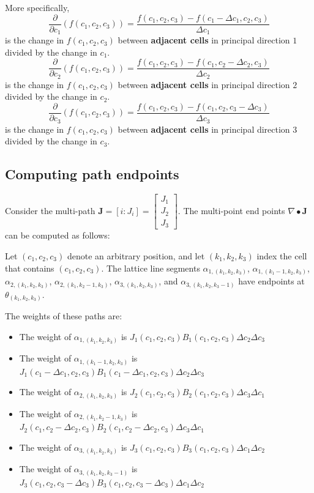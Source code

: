 More specifically, 
\[\frac{\partial}{\partial c_1}(f(c_1, c_2, c_3)) = \frac{f(c_1, c_2, c_3) - f(c_1 - \Delta c_1, c_2, c_3)}{\Delta c_1}\]
is the change in \(f(c_1, c_2, c_3)\) between {\bf adjacent cells} in principal direction \(1\) divided by the change in \(c_1\).
\[\frac{\partial}{\partial c_2}(f(c_1, c_2, c_3)) = \frac{f(c_1, c_2, c_3) - f(c_1, c_2 - \Delta c_2, c_3)}{\Delta c_2}\]
is the change in \(f(c_1, c_2, c_3)\) between {\bf adjacent cells} in principal direction \(2\) divided by the change in \(c_2\).
\[\frac{\partial}{\partial c_3}(f(c_1, c_2, c_3)) = \frac{f(c_1, c_2, c_3) - f(c_1, c_2, c_3 - \Delta c_3)}{\Delta c_3}\]
is the change in \(f(c_1, c_2, c_3)\) between {\bf adjacent cells} in principal direction \(3\) divided by the change in \(c_3\).




\subsection{Computing path endpoints}

Consider the multi-path \(\mathbf{J} = [i : J_i] = \begin{bmatrix} J_1 \\ J_2 \\ J_3 \end{bmatrix}\). The multi-point end points \(\nabla \bullet \mathbf{J}\) can be computed as follows:

Let \((c_1, c_2, c_3)\) denote an arbitrary position, and let \((k_1, k_2, k_3)\) index the cell that contains \((c_1, c_2, c_3)\). The lattice line segments \(\alpha_{1,(k_1,k_2,k_3)}\), \(\alpha_{1,(k_1-1,k_2,k_3)}\), \(\alpha_{2,(k_1,k_2,k_3)}\), \(\alpha_{2,(k_1,k_2-1,k_3)}\), \(\alpha_{3,(k_1,k_2,k_3)}\), and \(\alpha_{3,(k_1,k_2,k_3-1)}\) have endpoints at \(\theta_{(k_1, k_2, k_3)}\). 

The weights of these paths are:
\begin{itemize}
\item The weight of \(\alpha_{1,(k_1,k_2,k_3)}\) is \(J_1(c_1,c_2,c_3) B_1(c_1, c_2, c_3) \Delta c_2 \Delta c_3\)
\item The weight of \(\alpha_{1,(k_1-1,k_2,k_3)}\) is \(J_1(c_1 - \Delta c_1,c_2,c_3) B_1(c_1 - \Delta c_1, c_2, c_3) \Delta c_2 \Delta c_3\)
\item The weight of \(\alpha_{2,(k_1,k_2,k_3)}\) is \(J_2(c_1,c_2,c_3) B_2(c_1, c_2, c_3) \Delta c_3 \Delta c_1\)
\item The weight of \(\alpha_{2,(k_1,k_2-1,k_3)}\) is \(J_2(c_1,c_2 - \Delta c_2,c_3) B_2(c_1, c_2 - \Delta c_2, c_3) \Delta c_3 \Delta c_1\)
\item The weight of \(\alpha_{3,(k_1,k_2,k_3)}\) is \(J_3(c_1,c_2,c_3) B_3(c_1, c_2, c_3) \Delta c_1 \Delta c_2\)
\item The weight of \(\alpha_{3,(k_1,k_2,k_3-1)}\) is \(J_3(c_1,c_2,c_3 - \Delta c_3) B_3(c_1, c_2, c_3 - \Delta c_3) \Delta c_1 \Delta c_2\)
\end{itemize}

